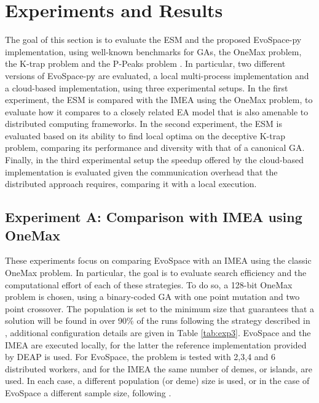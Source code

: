 \section{Experiments and Results}
\label{sec:exp1}
The goal of this section is to evaluate the ESM and the proposed EvoSpace-py implementation, using well-known benchmarks for GAs,
the OneMax problem, the K-trap problem \cite{trap} and the P-Peaks problem \cite{Jong:PS97}.
In particular, two different versions of EvoSpace-py are evaluated, a local multi-process implementation and a cloud-based implementation,
using three experimental setups.
In the first experiment, the ESM is compared with the IMEA using the OneMax problem, to evaluate how it compares to a closely related EA model that is also
amenable to distributed computing frameworks.
In the second experiment, the ESM is evaluated based on its ability to find local optima on the deceptive K-trap problem,
comparing its performance and diversity with that of a canonical GA.
Finally, in the third experimental setup the speedup offered by the cloud-based implementation is evaluated given the communication overhead
that the distributed approach requires, comparing it with a local execution.


\subsection{Experiment A: Comparison with IMEA using OneMax}
These experiments focus on comparing EvoSpace with an IMEA using the classic OneMax problem.
In particular, the goal is to evaluate search efficiency and the computational effort of each of these strategies.
To do so, a 128-bit OneMax problem is chosen, using a binary-coded GA with one point mutation and two point crossover.
The population is set to the minimum size that guarantees that
a solution will be found in over 90\% of the runs following the strategy described in \cite{nodeo},
additional configuration details are given in Table \ref{tab:exp3}.
EvoSpace and the IMEA are executed locally, for the latter the reference implementation provided by DEAP is used.
For EvoSpace, the problem is tested with 2,3,4 and 6 distributed workers,
and for the IMEA the same number of demes, or islands, are used. In each case, a different population (or deme) size is used, or in 
the case of EvoSpace a different sample size, following \cite{nodeo}.

